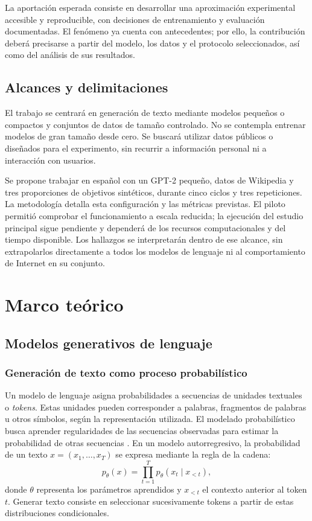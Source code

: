 \documentclass[12pt,letterpaper]{article}
\begin{document}
La aportación esperada consiste en desarrollar una aproximación experimental
accesible y reproducible, con decisiones de entrenamiento y evaluación
documentadas. El fenómeno ya cuenta con antecedentes; por ello, la
contribución deberá precisarse a partir del modelo, los datos y el protocolo
seleccionados, así como del análisis de sus resultados.

\subsection{Alcances y delimitaciones}

El trabajo se centrará en generación de texto mediante modelos pequeños o
compactos y conjuntos de datos de tamaño controlado. No se contempla
entrenar modelos de gran tamaño desde cero. Se buscará utilizar datos
públicos o diseñados para el experimento, sin recurrir a información personal
ni a interacción con usuarios.

Se propone trabajar en español con un GPT-2 pequeño, datos de Wikipedia y
tres proporciones de objetivos sintéticos, durante cinco ciclos y tres
repeticiones. La metodología detalla esta configuración y las métricas
previstas. El piloto permitió comprobar el funcionamiento a escala reducida;
la ejecución del estudio principal sigue pendiente y dependerá de los recursos
computacionales y del tiempo disponible. Los hallazgos se interpretarán dentro de ese alcance,
sin extrapolarlos directamente a todos los modelos de lenguaje ni al
comportamiento de Internet en su conjunto.

\section{Marco teórico}

\subsection{Modelos generativos de lenguaje}

\subsubsection{Generación de texto como proceso probabilístico}

Un modelo de lenguaje asigna probabilidades a secuencias de unidades
textuales o \textit{tokens}. Estas unidades pueden corresponder a palabras,
fragmentos de palabras u otros símbolos, según la representación utilizada.
El modelado probabilístico busca aprender regularidades de las secuencias
observadas para estimar la probabilidad de otras secuencias
\cite{bengio2003}. En un modelo autorregresivo, la probabilidad de un texto
\(x=(x_1,\ldots,x_T)\) se expresa mediante la regla de la cadena:
\begin{equation}
    p_{\theta}(x)=\prod_{t=1}^{T}p_{\theta}(x_t\mid x_{<t}),
\end{equation}
donde \(\theta\) representa los parámetros aprendidos y \(x_{<t}\) el contexto
anterior al token \(t\). Generar texto consiste en seleccionar sucesivamente
tokens a partir de estas distribuciones condicionales.
\end{document}
